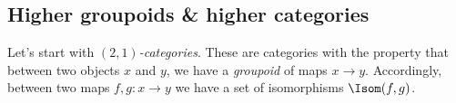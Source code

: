 
\subsection{Higher groupoids \& higher categories \inc}%
\label{sub:highergroupoidshighercategories}
Let's start with \emph{$(2,1)$-categories}.
These are categories with the property that between two objects $x$ and $y$, we have a \emph{groupoid} of maps $x \to y$.
Accordingly, between two maps $f,g \colon x \to y$ we have a set of isomorphisms $\Isom(f,g)$.

